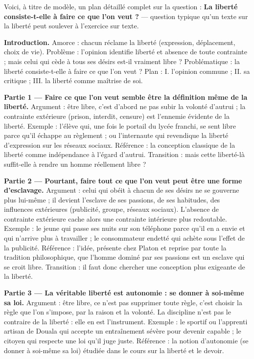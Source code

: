 \documentclass[11pt]{article}
\begin{document}
Voici, à titre de modèle, un plan détaillé complet sur la question : \og \textbf{La liberté consiste-t-elle à faire ce que l'on veut ?}\fg{} — question typique qu'un texte sur la liberté peut soulever à l'exercice sur texte.

\begin{exemplebox}
\textbf{Introduction.} Amorce : chacun réclame la liberté (expression, déplacement, choix de vie). Problème : l'opinion identifie liberté et absence de toute contrainte ; mais celui qui cède à tous ses désirs est-il vraiment libre ? Problématique : la liberté consiste-t-elle à faire ce que l'on veut ? Plan : I. l'opinion commune ; II. sa critique ; III. la liberté comme maîtrise de soi.

\textbf{Partie 1 — Faire ce que l'on veut semble être la définition même de la liberté.}
Argument : être libre, c'est d'abord ne pas subir la volonté d'autrui ; la contrainte extérieure (prison, interdit, censure) est l'ennemie évidente de la liberté. Exemple : l'élève qui, une fois le portail du lycée franchi, se sent \og libre\fg{} parce qu'il échappe au règlement ; ou l'internaute qui revendique la liberté d'expression sur les réseaux sociaux. Référence : la conception classique de la liberté comme indépendance à l'égard d'autrui. Transition : mais cette liberté-là suffit-elle à rendre un homme réellement libre ?

\textbf{Partie 2 — Pourtant, faire tout ce que l'on veut peut être une forme d'esclavage.}
Argument : celui qui obéit à chacun de ses désirs ne se gouverne plus lui-même ; il devient l'esclave de ses passions, de ses habitudes, des influences extérieures (publicité, groupe, réseaux sociaux). L'absence de contrainte extérieure cache alors une contrainte intérieure plus redoutable. Exemple : le jeune qui passe ses nuits sur son téléphone \og parce qu'il en a envie\fg{} et qui n'arrive plus à travailler ; le consommateur endetté qui achète sous l'effet de la publicité. Référence : l'idée, présente chez Platon et reprise par toute la tradition philosophique, que l'homme dominé par ses passions est un esclave qui se croit libre. Transition : il faut donc chercher une conception plus exigeante de la liberté.

\textbf{Partie 3 — La véritable liberté est autonomie : se donner à soi-même sa loi.}
Argument : être libre, ce n'est pas supprimer toute règle, c'est choisir la règle que l'on s'impose, par la raison et la volonté. La discipline n'est pas le contraire de la liberté : elle en est l'instrument. Exemple : le sportif ou l'apprenti artisan de Douala qui accepte un entraînement sévère pour devenir capable ; le citoyen qui respecte une loi qu'il juge juste. Référence : la notion d'autonomie (se donner à soi-même sa loi) étudiée dans le cours sur la liberté et le devoir. 


\end{exemplebox}
\end{document}
